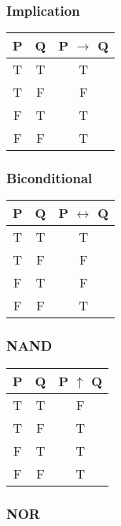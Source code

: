 \begin{multicols}{2}
\subsubsection{Implication}

\begin{table}[H]
\centering
\begin{tabular}[t]{|c|c|c|}
\hline
\textbf{P} & \textbf{Q} & \textbf{P $\to$ Q} \\ \hline
T & T & T \\ \hline
T & F & F \\ \hline
F & T & T \\ \hline
F & F & T \\ \hline
\end{tabular}
\end{table}

\subsubsection{Biconditional}

\begin{table}[H]
\centering
\begin{tabular}[t]{|c|c|c|}
\hline
\textbf{P} & \textbf{Q} & \textbf{P $\leftrightarrow$ Q} \\ \hline
T & T & T \\ \hline
T & F & F \\ \hline
F & T & F \\ \hline
F & F & T \\ \hline
\end{tabular}
\end{table}

\subsubsection{NAND}

\begin{table}[H]
\centering
\begin{tabular}[t]{|c|c|c|}
\hline
\textbf{P} & \textbf{Q} & \textbf{P $\uparrow$ Q} \\ \hline
T & T & F \\ \hline
T & F & T \\ \hline
F & T & T \\ \hline
F & F & T \\ \hline
\end{tabular}
\end{table}

\subsubsection{NOR}


\end{multicols}

